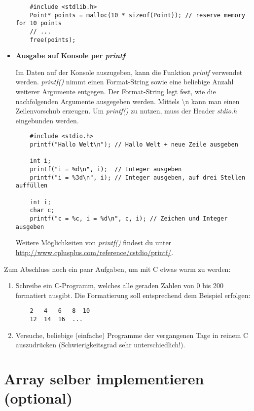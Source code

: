 \begin{itemize}
	\begin{lstlisting}
	#include <stdlib.h>
	Point* points = malloc(10 * sizeof(Point)); // reserve memory for 10 points
	// ...
	free(points);
	\end{lstlisting} 
	
	\item[] \textbf{Ausgabe auf Konsole per \emph{printf}}
	
	Im Daten auf der Konsole auszugeben, kann die Funktion \emph{printf} verwendet werden.
	\emph{printf()} nimmt einen Format-String sowie eine beliebige Anzahl weiterer Argumente entgegen.
	Der Format-String legt fest, wie die nachfolgenden Argumente ausgegeben werden.
	Mittels \textbackslash n kann man einen Zeilenvorschub erzeugen. Um \emph{printf()} zu nutzen, muss der Header \emph{stdio.h} eingebunden werden. 
	
	\begin{lstlisting}
	#include <stdio.h>
	printf("Hallo Welt\n"); // Hallo Welt + neue Zeile ausgeben
	
	int i;
	printf("i = %d\n", i);  // Integer ausgeben
	printf("i = %3d\n", i); // Integer ausgeben, auf drei Stellen auffüllen
	
	int i;
	char c;
	printf("c = %c, i = %d\n", c, i); // Zeichen und Integer ausgeben
	\end{lstlisting} 
	
	Weitere Möglichkeiten von \emph{printf()} findest du unter \url{http://www.cplusplus.com/reference/cstdio/printf/}.
	
\end{itemize}

Zum Abschluss noch ein paar Aufgaben, um mit C etwas warm zu werden:

\begin{enumerate}
	\item 
	Schreibe ein C-Programm, welches alle geraden Zahlen von 0 bis 200 formatiert ausgibt. 
	Die Formatierung soll entsprechend dem Beispiel erfolgen:
	\begin{lstlisting}
	2   4   6   8  10
	12  14  16  ...
	\end{lstlisting}
	
	\item Versuche, beliebige (einfache) Programme der vergangenen Tage in reinem C auszudrücken (Schwierigkeitsgrad sehr unterschiedlich!).
\end{enumerate}

\section{Array selber implementieren (optional)}
\label{sec:array}

